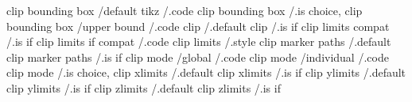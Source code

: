 clip bounding box    /default tikz /.code
clip bounding box                  /.is choice, 
clip bounding box    /upper bound  /.code
clip                               /.default    
clip                               /.is if      
clip limits compat                 /.is if      
clip limits if compat              /.code       
clip limits                        /.style      
clip marker paths                  /.default    
clip marker paths                  /.is if      
clip mode            /global       /.code
clip mode            /individual   /.code
clip mode                          /.is choice, 
clip xlimits                       /.default    
clip xlimits                       /.is if      
clip ylimits                       /.default    
clip ylimits                       /.is if      
clip zlimits                       /.default    
clip zlimits                       /.is if      

